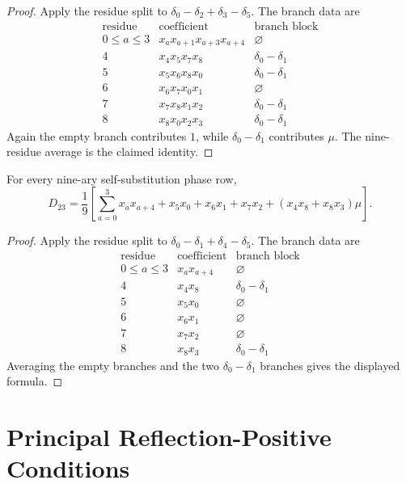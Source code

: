 \begin{proof}
Apply the residue split to
$\delta_0-\delta_2+\delta_3-\delta_5$. The branch data are
$$
\begin{array}{c|c|c}
\text{residue} & \text{coefficient} & \text{branch block}\\
\hline
0\le a\le3 & x_ax_{a+1}x_{a+3}x_{a+4} & \varnothing\\
4 & x_4x_5x_7x_8 & \delta_0-\delta_1\\
5 & x_5x_6x_8x_0 & \delta_0-\delta_1\\
6 & x_6x_7x_0x_1 & \varnothing\\
7 & x_7x_8x_1x_2 & \delta_0-\delta_1\\
8 & x_8x_0x_2x_3 & \delta_0-\delta_1
\end{array}
$$
Again the empty branch contributes $1$, while
$\delta_0-\delta_1$ contributes $\mu$. The nine-residue average is the
claimed identity.
\end{proof}

\begin{theorem}
\label{thm:innovation-input-nine-complex-dtwentythree-formula}
For every nine-ary self-substitution phase row,
$$
D_{23}
=
\frac19
\left[
\sum_{a=0}^{3}x_ax_{a+4}
+
x_5x_0+x_6x_1+x_7x_2
+
(x_4x_8+x_8x_3)\mu
\right].
$$
\end{theorem}

\begin{proof}
Apply the residue split to
$\delta_0-\delta_1+\delta_4-\delta_5$. The branch data are
$$
\begin{array}{c|c|c}
\text{residue} & \text{coefficient} & \text{branch block}\\
\hline
0\le a\le3 & x_ax_{a+4} & \varnothing\\
4 & x_4x_8 & \delta_0-\delta_1\\
5 & x_5x_0 & \varnothing\\
6 & x_6x_1 & \varnothing\\
7 & x_7x_2 & \varnothing\\
8 & x_8x_3 & \delta_0-\delta_1
\end{array}
$$
Averaging the empty branches and the two
$\delta_0-\delta_1$ branches gives the displayed formula.
\end{proof}

\section{Principal Reflection-Positive Conditions}
\label{sec:innovation-input-nine-complex-principal-rp-conditions}

